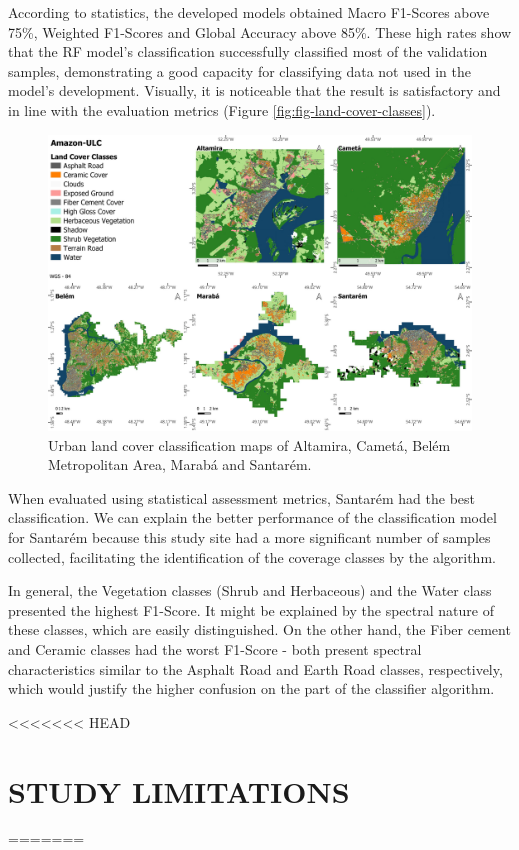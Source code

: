 \documentclass[preprint, 3p,
authoryear]{elsarticle} %
\begin{document}
According to statistics, the developed models obtained Macro F1-Scores
above 75\%, Weighted F1-Scores and Global Accuracy above 85\%. These
high rates show that the RF model's classification successfully
classified most of the validation samples, demonstrating a good capacity
for classifying data not used in the model's development. Visually, it
is noticeable that the result is satisfactory and in line with the
evaluation metrics (Figure \ref{fig:fig-land-cover-classes}).

\begin{figure}
\includegraphics[width=.8\linewidth]{images/ULC_Legend_v2-tile} \caption{\label{fig:fig-land-cover-classes}Urban land cover classification maps of Altamira, Cametá, Belém Metropolitan Area, Marabá and Santarém.}\label{fig:fig-2}
\end{figure}

When evaluated using statistical assessment metrics, Santarém had the
best classification. We can explain the better performance of the
classification model for Santarém because this study site had a more
significant number of samples collected, facilitating the identification
of the coverage classes by the algorithm.

In general, the Vegetation classes (Shrub and Herbaceous) and the Water
class presented the highest F1-Score. It might be explained by the
spectral nature of these classes, which are easily distinguished. On the
other hand, the Fiber cement and Ceramic classes had the worst F1-Score
- both present spectral characteristics similar to the Asphalt Road and
Earth Road classes, respectively, which would justify the higher
confusion on the part of the classifier algorithm.

\hypertarget{study-limitations}{%
<<<<<<< HEAD
\section{STUDY LIMITATIONS}\label{study-limitations}}
=======
\end{document}
